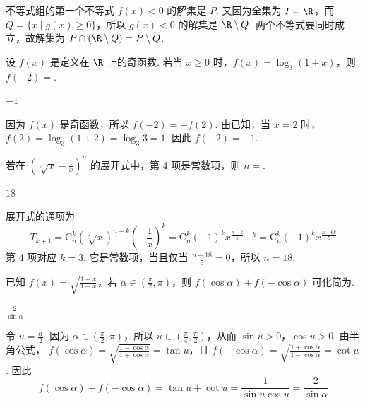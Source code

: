 \begin{solution}
不等式组的第一个不等式 \(f(x)<0\) 的解集是 \(P\). 又因为全集为 \(I=\R\)，而 \(Q=\{x\mid g(x)\geqslant0\}\)，所以 \(g(x)<0\) 的解集是 \(\R\mathbin{\backslash}Q\). 两个不等式要同时成立，故解集为 \(P\cap(\R\mathbin{\backslash}Q)=P\mathbin{\backslash}Q\).
\end{solution}

\begin{problem}
设 \( f(x) \) 是定义在 \( \R \) 上的奇函数. 若当 \( x \geqslant 0 \) 时，\( f(x) = \log_3(1 + x) \)，则 \( f(-2) = \)\fillinblank{}.

\end{problem}

\begin{answer}
\(-1\)
\end{answer}

\begin{solution}
因为 \(f(x)\) 是奇函数，所以 \(f(-2)=-f(2)\). 由已知，当 \(x=2\) 时，\(f(2)=\log_3(1+2)=\log_3 3=1\). 因此 \(f(-2)=-1\).
\end{solution}

\begin{problem}
若在 \(\left(\sqrt[5]{x} - \frac{1}{x}\right)^n\) 的展开式中，第 4 项是常数项，则 \(n = \)\fillinblank{}.
\end{problem}

\begin{answer}
\(18\)
\end{answer}

\begin{solution}
展开式的通项为
\[
T_{k+1}=\mathrm C_n^k\left(\sqrt[5]{x}\right)^{n-k}\left(-\frac{1}{x}\right)^k=\mathrm C_n^k(-1)^k x^{\frac{n-k}{5}-k}=\mathrm C_n^k(-1)^k x^{\frac{n-6k}{5}}
\]
第 4 项对应 \(k=3\). 它是常数项，当且仅当 \(\frac{n-18}{5}=0\)，所以 \(n=18\).
\end{solution}

\begin{problem}
已知 \( f(x) = \sqrt{\frac{1 - x}{1 + x}} \)，若 \( \alpha \in \left(\frac{\pi}{2}, \pi\right) \)，则 \( f(\cos \alpha) + f(-\cos \alpha) \) 可化简为\fillinblank{}.
\end{problem}

\begin{answer}
\(\frac{2}{\sin\alpha}\)
\end{answer}

\begin{solution}
令 \(u=\frac{\alpha}{2}\). 因为 \(\alpha\in\left(\frac{\pi}{2},\pi\right)\)，所以 \(u\in\left(\frac{\pi}{4},\frac{\pi}{2}\right)\)，从而 \(\sin u>0\)，\(\cos u>0\). 由半角公式，
\(f(\cos\alpha)=\sqrt{\frac{1-\cos\alpha}{1+\cos\alpha}}=\tan u\)，且 \(f(-\cos\alpha)=\sqrt{\frac{1+\cos\alpha}{1-\cos\alpha}}=\cot u\).
因此
\[
f(\cos\alpha)+f(-\cos\alpha)=\tan u+\cot u=\frac{1}{\sin u\cos u}=\frac{2}{\sin\alpha}
\]
\end{solution}

